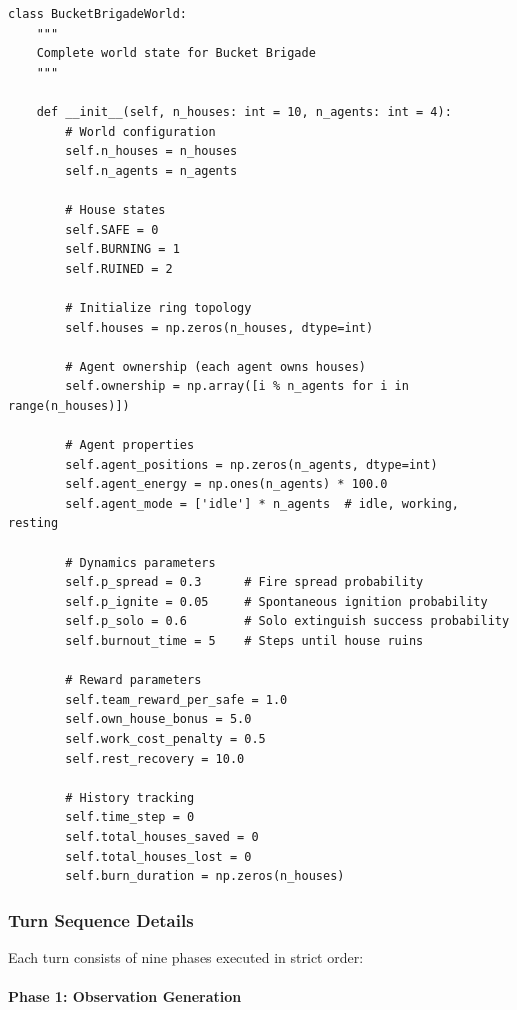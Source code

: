 \documentclass[10pt, letterpaper]{article}
\begin{document}
\begin{lstlisting}
class BucketBrigadeWorld:
    """
    Complete world state for Bucket Brigade
    """

    def __init__(self, n_houses: int = 10, n_agents: int = 4):
        # World configuration
        self.n_houses = n_houses
        self.n_agents = n_agents

        # House states
        self.SAFE = 0
        self.BURNING = 1
        self.RUINED = 2

        # Initialize ring topology
        self.houses = np.zeros(n_houses, dtype=int)

        # Agent ownership (each agent owns houses)
        self.ownership = np.array([i % n_agents for i in range(n_houses)])

        # Agent properties
        self.agent_positions = np.zeros(n_agents, dtype=int)
        self.agent_energy = np.ones(n_agents) * 100.0
        self.agent_mode = ['idle'] * n_agents  # idle, working, resting

        # Dynamics parameters
        self.p_spread = 0.3      # Fire spread probability
        self.p_ignite = 0.05     # Spontaneous ignition probability
        self.p_solo = 0.6        # Solo extinguish success probability
        self.burnout_time = 5    # Steps until house ruins

        # Reward parameters
        self.team_reward_per_safe = 1.0
        self.own_house_bonus = 5.0
        self.work_cost_penalty = 0.5
        self.rest_recovery = 10.0

        # History tracking
        self.time_step = 0
        self.total_houses_saved = 0
        self.total_houses_lost = 0
        self.burn_duration = np.zeros(n_houses)
\end{lstlisting}

\subsubsection{Turn Sequence Details}

Each turn consists of nine phases executed in strict order:

\paragraph{Phase 1: Observation Generation}
\end{document}
